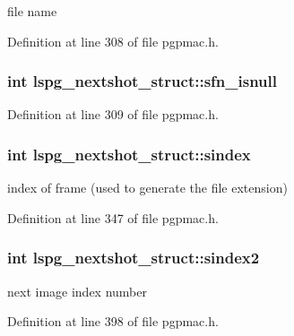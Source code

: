 file name 



Definition at line 308 of file pgpmac.\-h.

\hypertarget{structlspg__nextshot__struct_a56f32eb413b1fca9f085874eb86294de}{
\subsubsection[{sfn\-\_\-isnull}]{\setlength{\rightskip}{0pt plus 5cm}int lspg\-\_\-nextshot\-\_\-struct\-::sfn\-\_\-isnull}}\label{structlspg__nextshot__struct_a56f32eb413b1fca9f085874eb86294de}


Definition at line 309 of file pgpmac.\-h.

\hypertarget{structlspg__nextshot__struct_a5d096f2c2bf9be29c44129b54eaf01da}{
\subsubsection[{sindex}]{\setlength{\rightskip}{0pt plus 5cm}int lspg\-\_\-nextshot\-\_\-struct\-::sindex}}\label{structlspg__nextshot__struct_a5d096f2c2bf9be29c44129b54eaf01da}


index of frame (used to generate the file extension) 



Definition at line 347 of file pgpmac.\-h.

\hypertarget{structlspg__nextshot__struct_ae9d0cfdff6868e0ba9cd5acafbe133db}{
\subsubsection[{sindex2}]{\setlength{\rightskip}{0pt plus 5cm}int lspg\-\_\-nextshot\-\_\-struct\-::sindex2}}\label{structlspg__nextshot__struct_ae9d0cfdff6868e0ba9cd5acafbe133db}


next image index number 



Definition at line 398 of file pgpmac.\-h.

